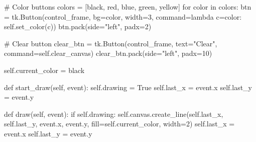 \documentclass[
  letterpaper,
  DIV=11,
  numbers=noendperiod,
  oneside]{scrreprt}
\newenvironment{Shaded}{}{}
\newcommand{\CommentTok}[1]{\textcolor[rgb]{0.42,0.45,0.49}{#1}}
\newcommand{\ControlFlowTok}[1]{\textcolor[rgb]{0.84,0.23,0.29}{#1}}
\newcommand{\DecValTok}[1]{\textcolor[rgb]{0.00,0.36,0.77}{#1}}
\newcommand{\KeywordTok}[1]{\textcolor[rgb]{0.84,0.23,0.29}{#1}}
\newcommand{\NormalTok}[1]{\textcolor[rgb]{0.14,0.16,0.18}{#1}}
\newcommand{\OperatorTok}[1]{\textcolor[rgb]{0.14,0.16,0.18}{#1}}
\newcommand{\StringTok}[1]{\textcolor[rgb]{0.01,0.18,0.38}{#1}}
\newcommand{\VariableTok}[1]{\textcolor[rgb]{0.89,0.38,0.04}{#1}}
\begin{document}
\begin{Shaded}
\begin{Highlighting}[]
        \CommentTok{\# Color buttons}
\NormalTok{        colors }\OperatorTok{=}\NormalTok{ [}\StringTok{\textquotesingle{}black\textquotesingle{}}\NormalTok{, }\StringTok{\textquotesingle{}red\textquotesingle{}}\NormalTok{, }\StringTok{\textquotesingle{}blue\textquotesingle{}}\NormalTok{, }\StringTok{\textquotesingle{}green\textquotesingle{}}\NormalTok{, }\StringTok{\textquotesingle{}yellow\textquotesingle{}}\NormalTok{]}
        \ControlFlowTok{for}\NormalTok{ color }\KeywordTok{in}\NormalTok{ colors:}
\NormalTok{            btn }\OperatorTok{=}\NormalTok{ tk.Button(control\_frame, bg}\OperatorTok{=}\NormalTok{color, width}\OperatorTok{=}\DecValTok{3}\NormalTok{,}
\NormalTok{                          command}\OperatorTok{=}\KeywordTok{lambda}\NormalTok{ c}\OperatorTok{=}\NormalTok{color: }\VariableTok{self}\NormalTok{.set\_color(c))}
\NormalTok{            btn.pack(side}\OperatorTok{=}\StringTok{"left"}\NormalTok{, padx}\OperatorTok{=}\DecValTok{2}\NormalTok{)}
        
        \CommentTok{\# Clear button}
\NormalTok{        clear\_btn }\OperatorTok{=}\NormalTok{ tk.Button(control\_frame, text}\OperatorTok{=}\StringTok{"Clear"}\NormalTok{, command}\OperatorTok{=}\VariableTok{self}\NormalTok{.clear\_canvas)}
\NormalTok{        clear\_btn.pack(side}\OperatorTok{=}\StringTok{"left"}\NormalTok{, padx}\OperatorTok{=}\DecValTok{10}\NormalTok{)}
        
        \VariableTok{self}\NormalTok{.current\_color }\OperatorTok{=} \StringTok{\textquotesingle{}black\textquotesingle{}}
        
    \KeywordTok{def}\NormalTok{ start\_draw(}\VariableTok{self}\NormalTok{, event):}
        \VariableTok{self}\NormalTok{.drawing }\OperatorTok{=} \VariableTok{True}
        \VariableTok{self}\NormalTok{.last\_x }\OperatorTok{=}\NormalTok{ event.x}
        \VariableTok{self}\NormalTok{.last\_y }\OperatorTok{=}\NormalTok{ event.y}
        
    \KeywordTok{def}\NormalTok{ draw(}\VariableTok{self}\NormalTok{, event):}
        \ControlFlowTok{if} \VariableTok{self}\NormalTok{.drawing:}
            \VariableTok{self}\NormalTok{.canvas.create\_line(}\VariableTok{self}\NormalTok{.last\_x, }\VariableTok{self}\NormalTok{.last\_y, event.x, event.y,}
\NormalTok{                                   fill}\OperatorTok{=}\VariableTok{self}\NormalTok{.current\_color, width}\OperatorTok{=}\DecValTok{2}\NormalTok{)}
            \VariableTok{self}\NormalTok{.last\_x }\OperatorTok{=}\NormalTok{ event.x}
            \VariableTok{self}\NormalTok{.last\_y }\OperatorTok{=}\NormalTok{ event.y}
            

\end{Highlighting}
\end{Shaded}
\end{document}
